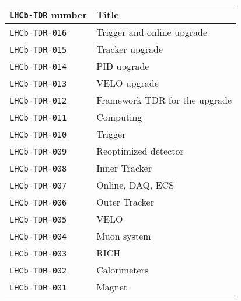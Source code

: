 \begin{center}
  \begin{tabular}{ll}
    \hline
    \texttt{LHCb-TDR} number & Title \\
    \hline
    \texttt{LHCb-TDR-016}~\cite{LHCb-TDR-016} &
    {\small Trigger and online upgrade} \\
    \texttt{LHCb-TDR-015}~\cite{LHCb-TDR-015} &
    {\small Tracker upgrade} \\
    \texttt{LHCb-TDR-014}~\cite{LHCb-TDR-014} &
    {\small PID upgrade} \\
    \texttt{LHCb-TDR-013}~\cite{LHCb-TDR-013} &
    {\small VELO upgrade} \\
    \texttt{LHCb-TDR-012}~\cite{LHCb-TDR-012} &
    {\small Framework TDR for the upgrade} \\
    \texttt{LHCb-TDR-011}~\cite{LHCb-TDR-011} &
    {\small Computing} \\
    \texttt{LHCb-TDR-010}~\cite{LHCb-TDR-010} &
    {\small Trigger} \\
    \texttt{LHCb-TDR-009}~\cite{LHCb-TDR-009} &
    {\small Reoptimized detector} \\
    \texttt{LHCb-TDR-008}~\cite{LHCb-TDR-008} &
    {\small Inner Tracker} \\
    \texttt{LHCb-TDR-007}~\cite{LHCb-TDR-007} &
    {\small Online, DAQ, ECS} \\
    \texttt{LHCb-TDR-006}~\cite{LHCb-TDR-006} &
    {\small Outer Tracker} \\
    \texttt{LHCb-TDR-005}~\cite{LHCb-TDR-005} &
    {\small VELO} \\
    \texttt{LHCb-TDR-004}~\cite{LHCb-TDR-004} &
    {\small Muon system} \\
    \texttt{LHCb-TDR-003}~\cite{LHCb-TDR-003} &
    {\small RICH} \\
    \texttt{LHCb-TDR-002}~\cite{LHCb-TDR-002} &
    {\small Calorimeters} \\
    \texttt{LHCb-TDR-001}~\cite{LHCb-TDR-001} &
    {\small Magnet} \\
    \hline
  \end{tabular}
\end{center}

